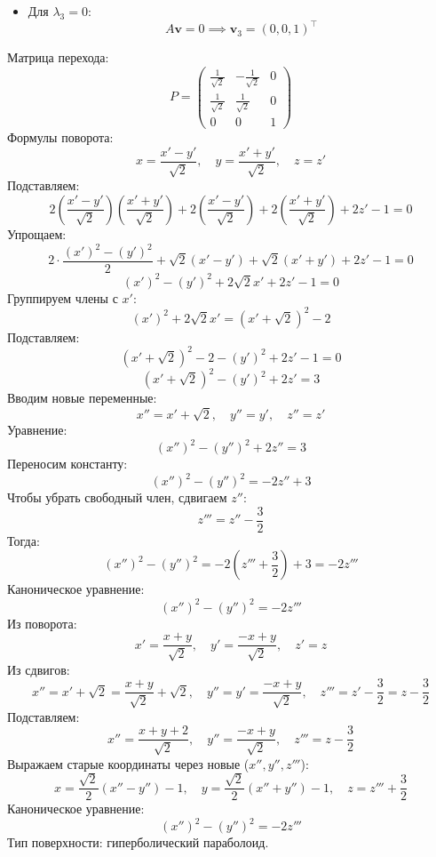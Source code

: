 \documentclass[a4paper]{article}
\begin{document}
\begin{enumerate}
\begin{enumerate}
\begin{itemize}
      \item  Для \(\lambda_3 = 0\):  
      \[
      A\mathbf{v} = 0 \implies \mathbf{v}_3 = (0, 0, 1)^\top
      \]  
    \end{itemize}
    Матрица перехода:  
    \[
    P = \begin{pmatrix}
    \frac{1}{\sqrt{2}} & -\frac{1}{\sqrt{2}} & 0 \\
    \frac{1}{\sqrt{2}} & \frac{1}{\sqrt{2}} & 0 \\
    0 & 0 & 1
    \end{pmatrix}
    \]  
    Формулы поворота:  
    \[
    x = \frac{x' - y'}{\sqrt{2}}, \quad y = \frac{x' + y'}{\sqrt{2}}, \quad z = z'
    \]  
    Подставляем:  
    \[
    2 \left( \frac{x' - y'}{\sqrt{2}} \right) \left( \frac{x' + y'}{\sqrt{2}} \right) + 2 \left( \frac{x' - y'}{\sqrt{2}} \right) + 2 \left( \frac{x' + y'}{\sqrt{2}} \right) + 2z' - 1 = 0
    \]  
    Упрощаем:  
    \[
    2 \cdot \frac{(x')^2 - (y')^2}{2} + \sqrt{2} (x' - y') + \sqrt{2} (x' + y') + 2z' - 1 = 0
    \]  
    \[
    (x')^2 - (y')^2 + 2\sqrt{2} x' + 2z' - 1 = 0
    \]  
    Группируем члены с \(x'\):  
    \[
    (x')^2 + 2\sqrt{2} x' = (x' + \sqrt{2})^2 - 2
    \]  
    Подставляем:  
    \[
    (x' + \sqrt{2})^2 - 2 - (y')^2 + 2z' - 1 = 0
    \]  
    \[
    (x' + \sqrt{2})^2 - (y')^2 + 2z' = 3
    \]  
    Вводим новые переменные:  
    \[
    x'' = x' + \sqrt{2}, \quad y'' = y', \quad z'' = z'
    \]  
    Уравнение:  
    \[
    (x'')^2 - (y'')^2 + 2z'' = 3
    \]  
    Переносим константу:  
    \[
    (x'')^2 - (y'')^2 = -2z'' + 3
    \]  
    Чтобы убрать свободный член, сдвигаем \(z''\):  
    \[
    z''' = z'' - \frac{3}{2}
    \]  
    Тогда:  
    \[
    (x'')^2 - (y'')^2 = -2 \left( z''' + \frac{3}{2} \right) + 3 = -2z'''
    \]  
    Каноническое уравнение:  
    \[
    (x'')^2 - (y'')^2 = -2z'''
    \]  
    Из поворота:  
    \[
    x' = \frac{x + y}{\sqrt{2}}, \quad y' = \frac{-x + y}{\sqrt{2}}, \quad z' = z
    \]  
    Из сдвигов:  
    \[
    x'' = x' + \sqrt{2} = \frac{x + y}{\sqrt{2}} + \sqrt{2}, \quad y'' = y' = \frac{-x + y}{\sqrt{2}}, \quad z''' = z' - \frac{3}{2} = z - \frac{3}{2}
    \]  
    Подставляем:  
    \[
    x'' = \frac{x + y + 2}{\sqrt{2}}, \quad y'' = \frac{-x + y}{\sqrt{2}}, \quad z''' = z - \frac{3}{2}
    \]  
    Выражаем старые координаты через новые (\(x'', y'', z'''\)):  
    \[
    x = \frac{\sqrt{2}}{2} (x'' - y'') - 1, \quad y = \frac{\sqrt{2}}{2} (x'' + y'') - 1, \quad z = z''' + \frac{3}{2}
    \]  
    Каноническое уравнение:  
    \[
    (x'')^2 - (y'')^2 = -2z'''
    \]  
    Тип поверхности: гиперболический параболоид.\\


\end{enumerate}
\end{enumerate}
\end{document}

